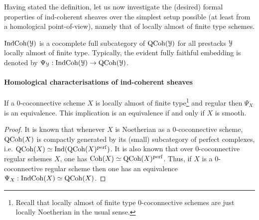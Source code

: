                 Having stated the definition, let us now investigate the (desired) formal properties of ind-coherent sheaves over the simplest setup possible (at least from a homological point-of-view), namely that of locally almost of finite type schemes. 
                \begin{convention} \label{conv: indcoh_to_qcoh_functor}
                    $\mathrm{Ind}\mathrm{Coh}(\mathcal{Y})$ is a cocomplete full subcategory of $\mathrm{QCoh}(\mathcal{Y})$ for all prestacks $\mathcal{Y}$ locally almost of finite type. Typically, the evident fully faithful embedding is denoted by $\Psi_{\mathcal{Y}}: \mathrm{Ind}\mathrm{Coh}(\mathcal{Y}) \to \mathrm{QCoh}(\mathcal{Y})$. 
                \end{convention}
                
                \paragraph{Homological characterisations of ind-coherent sheaves}
                    \begin{theorem} \label{theorem: indcoh_on_classically__regular_and_smooth_schemes}
                        If a $0$-coconnective scheme $X$ is locally almost of finite type\footnote{Recall that locally almost of finite type $0$-coconnective schemes are just locally Noetherian in the usual sense.} and regular then $\Psi_X$ is an equivalence. This implication is an equivalence if and only if $X$ is smooth.
                    \end{theorem}
                        \begin{proof}
                            It is known that whenever $X$ is Noetherian as a $0$-coconnective scheme, $\mathrm{QCoh}(X)$ is compactly generated by its (small) subcategory of perfect complexes, i.e. $\mathrm{QCoh}(X) \simeq \mathrm{Ind}(\mathrm{QCoh}(X)^{\mathrm{perf}})$. It is also known that over $0$-coconnective regular schemes $X$, one has $\mathrm{Coh}(X) \simeq \mathrm{QCoh}(X)^{\mathrm{perf}}$. Thus, if $X$ is a $0$-coconnective regular scheme then one has an equivalence $\Psi_X: \mathrm{Ind}\mathrm{Coh}(X) \simeq \mathrm{QCoh}(X)$.
                            
                        \end{proof}
                        
